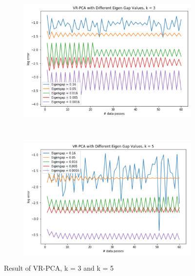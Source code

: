 \documentclass{article}
\begin{document}
\begin{figure}[h]
    \centering
    \begin{subfigure}[h]{\textwidth}
        \centering
        \includegraphics[scale=0.45]{./plot2_1.png}
    \end{subfigure}
    ~
    \begin{subfigure}[h]{\textwidth}
        \centering
        \includegraphics[scale=0.45]{./plot2_2.png}
    \end{subfigure}
    \caption{Result of VR-PCA, k = 3 and k = 5}
\end{figure}
\end{document}
